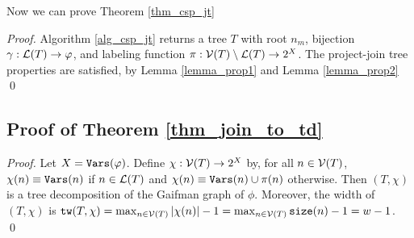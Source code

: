 Now we can prove Theorem \ref{thm_csp_jt}
\begin{proof}
    Algorithm \ref{alg_csp_jt} returns a tree $T$ with root $n_m$, bijection $\gamma : \mathcal{L}(T) \to \varphi$, and labeling function $\pi : \mathcal{V}(T) \setminus \mathcal{L}(T) \to 2^X$.
    The project-join tree properties are satisfied, by Lemma \ref{lemma_prop1} and Lemma \ref{lemma_prop2}
\qed
\end{proof}




\subsection{Proof of Theorem \ref{thm_join_to_td}}

\begin{proof}
    Let $X = \texttt{\upshape Vars}(\varphi)$.
    Define $\chi: \mathcal{V}(T) \to 2^X$ by, for all $n \in \mathcal{V}(T)$,
    $\chi(n) \equiv\texttt{\upshape Vars}(n)$ if $n \in \mathcal{L}(T)$ and $\chi(n) \equiv \texttt{\upshape Vars}(n) \cup \pi(n)$ otherwise.
    Then $(T, \chi)$ is a tree decomposition of the Gaifman graph of $\phi$.
    Moreover, the width of $(T, \chi)$ is $\texttt{\upshape tw}(T, \chi) = \max_{n \in \mathcal{V}(T)} \left| \chi (n) \right|  - 1 = \max_{n \in \mathcal{V}(T)} \texttt{\upshape size}(n) - 1 = w - 1$.
\qed
\end{proof}
